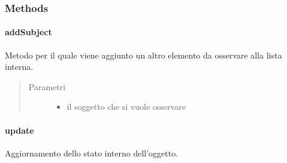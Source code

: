 \documentclass[letterpaper,10pt,italian,openany,oneside]{sphinxmanual}
\begin{document}
\subsubsection{Methods}
\label{\detokenize{source/it/unicam/cs/pa/mastermind/ui/BoardObserver:methods}}

\paragraph{addSubject}
\label{\detokenize{source/it/unicam/cs/pa/mastermind/ui/BoardObserver:addsubject}}

\begin{fulllineitems}
\label{\detokenize{source/it/unicam/cs/pa/mastermind/ui/BoardObserver:it.unicam.cs.pa.mastermind.ui.BoardObserver.addSubject(BoardModel)}}
Metodo per il quale viene aggiunto un altro elemento da osservare alla lista interna.
\begin{quote}\begin{description}
\item[{Parametri}] \leavevmode\begin{itemize}
\item {} 
 \textendash{} il soggetto che si vuole osservare

\end{itemize}

\end{description}\end{quote}

\end{fulllineitems}



\paragraph{update}
\label{\detokenize{source/it/unicam/cs/pa/mastermind/ui/BoardObserver:update}}

\begin{fulllineitems}
\label{\detokenize{source/it/unicam/cs/pa/mastermind/ui/BoardObserver:it.unicam.cs.pa.mastermind.ui.BoardObserver.update()}}
Aggiornamento dello stato interno dell’oggetto.

\end{fulllineitems}
\end{document}
